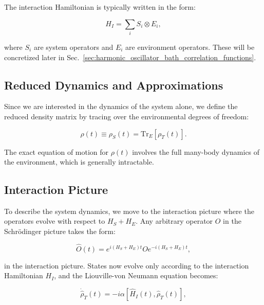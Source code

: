 \noindent The interaction Hamiltonian is typically written in the form:

\begin{equation}
	H_I = \sum_i S_i \otimes E_i,
	\label{eq:Interaction_Hamiltonian}
\end{equation}

\noindent
where $S_i$ are system operators and $E_i$ are environment operators. These will be concretized later in Sec.~\ref{sec:harmonic_oscillator_bath_correlation_functions}.

\subsection{Reduced Dynamics and Approximations}

\noindent
Since we are interested in the dynamics of the system alone, we define the reduced density matrix by tracing over the environmental degrees of freedom:

\begin{equation}
	\rho(t) \equiv \rho_S(t)= \mathrm{Tr}_E[\rho_T(t)].
	\label{eq:Reduced_Density_Matrix}
\end{equation}

\noindent
The exact equation of motion for $\rho(t)$ involves the full many-body dynamics of the environment, which is generally intractable.



\subsection{Interaction Picture}

\noindent
To describe the system dynamics, we move to the interaction picture where the operators evolve with respect to $H_S + H_E$. Any arbitrary operator $O$ in the Schrödinger picture takes the form:

\begin{equation}
	\hat{O}(t) = e^{i(H_S+H_E)t} O e^{-i(H_S+H_E)t},
	\label{eq:Interaction_Picture_Operators}
\end{equation}

\noindent
in the interaction picture. States now evolve only according to the interaction Hamiltonian $H_I$, and the Liouville-von Neumann equation becomes:

\begin{equation}
	\dot{\hat{\rho}}_T(t) = -i \alpha [\hat{H}_I(t), \hat{\rho}_T(t)],
	\label{eq:LiouvilleVN}
\end{equation}

